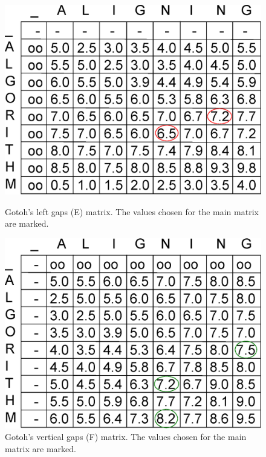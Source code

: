 \begin{figure}[htb!]
 \begin{minipage}{0.48\linewidth}
	\centering
	\includegraphics[scale=0.45]{img-align/nw-affine-gotoh-Emat.eps}
	\caption[Gotoh's E matrix] {Gotoh's left gaps (E) matrix. The values chosen for the main matrix are marked.}
	\label{nw-affine-gotoh-Emat}
  \end{minipage}
  \hspace{0.04\linewidth}
  \begin{minipage}{0.48\linewidth}
	\centering
	\includegraphics[scale=0.45]{img-align/nw-affine-gotoh-Fmat.eps}
	\caption[Gotoh's F matrix] {Gotoh's vertical gaps (F) matrix. The values chosen for the main matrix are marked.}
	\label{nw-affine-gotoh-Fmat}
  \end{minipage}
\end{figure} 



